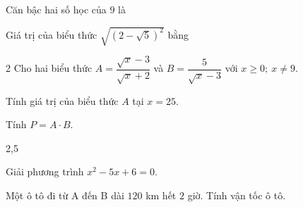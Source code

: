 \documentclass[12pt]{article}
\begin{document}
\taodaude

\phantn[3,0]
\begin{tn}
Căn bậc hai số học của $9$ là
\end{tn}
\begin{tn}
Giá trị của biểu thức $\sqrt{(2-\sqrt5)^2}$ bằng
\end{tn}

\phantl[7,0]
\begin{baihn}{2}
Cho hai biểu thức $A=\dfrac{\sqrt{x}-3}{\sqrt{x}+2}$ và $B=\dfrac{5}{\sqrt{x}-3}$ với $x\ge0;\ x\ne9$.
\begin{ychinh}
\item Tính giá trị của biểu thức $A$ tại $x=25$.
\item Tính $P=A\cdot B$.
\end{ychinh}
\end{baihn}

\begin{baihn}{2,5}
\begin{ychinh}
\item Giải phương trình $x^2-5x+6=0$.
\item Một ô tô đi từ A đến B dài $120$ km hết $2$ giờ. Tính vận tốc ô tô.
\end{ychinh}
\end{baihn}

\hetde
\newpage
\bangdapan
\end{document}
